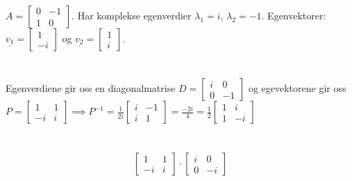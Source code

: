 \documentclass[11pt, a4paper, norsk]{article}
\begin{document}
        
        \begin{Example}{}{}
            $A = \begin{bmatrix}
                0 & -1 \\
                1 & 0
            \end{bmatrix}$. Har komplekse egenverdier $\lambda_1 = i$, $\lambda_2 = -1$. Egenvektorer: $\underline{v_1} = \begin{bmatrix}
                1 \\
                -i
            \end{bmatrix}$ og $\underline{v_2} = \begin{bmatrix}
                1 \\
                i
            \end{bmatrix}$. 
            \\
            \\
            \\
            Egenverdiene gir oss en diagonalmatrise $D = \begin{bmatrix}
                i & 0 \\
                0 & -1
            \end{bmatrix}$ og egevektorene gir oss $P = \begin{bmatrix}
                1 & 1 \\
                -i & i
            \end{bmatrix} \implies P^{-1} = \frac{1}{2i} \begin{bmatrix}
                i & -1 \\
                i & 1
            \end{bmatrix} = \frac{-2i}{4} = \frac{1}{2} \begin{bmatrix}
                1 & i \\
                1 & -i
            \end{bmatrix}$ 
            \\
            \\
            \\
            \begin{align*}
                \begin{bmatrix}
                    1 & 1 \\
                    -i & i
                \end{bmatrix} \cdot \begin{bmatrix}
                    i & 0 \\
                    0 & -i

\end{bmatrix}
\end{align*}
\end{Example}
\end{document}
